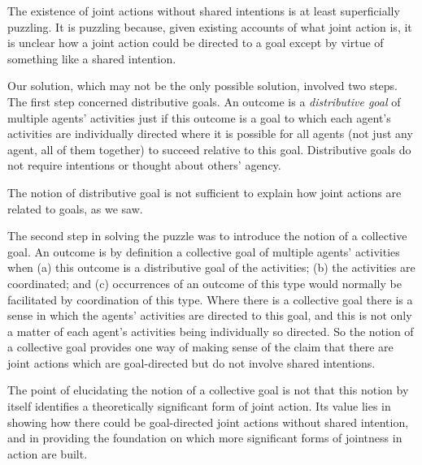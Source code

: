 \documentclass[12pt,a4paper]{extarticle}
\begin{document}
The existence of joint actions without shared intentions is at least superficially puzzling.
It is puzzling because, 
given existing accounts of what joint action is, 
it is unclear how a joint action could be directed to a goal except by virtue of something like a shared intention.

Our solution, which may not be the only possible solution, involved two steps.  
The first step concerned distributive goals.  
An outcome is a \emph{distributive goal} of multiple agents' activities just if this outcome is a goal to which each agent's activities are individually directed where it is possible for all agents  (not just any agent, all of them together) to succeed relative to this goal.
Distributive goals  do not require intentions or thought about others' agency.

The notion of distributive goal is not sufficient to explain how joint actions are related to goals, as we saw.

The second step in solving the puzzle was to introduce the notion of a collective goal.  An outcome is by definition a collective goal of multiple agents' activities when (a) this outcome is a distributive goal of the activities; (b) the activities are coordinated; and (c)  occurrences of an outcome of this type would normally be facilitated by coordination of this type.  Where there is a collective goal there is a sense in which the agents' activities are directed to this goal, and this is not only a matter of each agent's activities being individually so directed.
So the notion of a collective goal provides one way of making sense of the claim that there are joint actions which are goal-directed but do not involve shared intentions.

The point of elucidating the notion of a collective goal is not that this notion by itself identifies a theoretically significant form of joint action.  Its value lies in showing how there could be goal-directed joint actions without shared intention, and in providing the foundation on which more significant forms of jointness in action are built.
\end{document}
